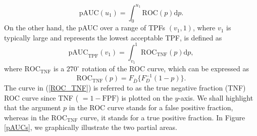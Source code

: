 \begin{equation}
\text{pAUC}\left(u_1\right) = \int_{0}^{u_1}\text{ROC}\left(p\right)\text{d}p.
\label{pAUC}
\end{equation}
On the other hand, the pAUC over a range of TPFs $(v_1,1)$, where $v_1$ is typically large and represents the lowest acceptable TPF, is defined as
\begin{equation}
\text{pAUC}_{\text{TPF}}\left(v_1\right) = \int_{v_1}^{1}\text{ROC}_{\text{TNF}}\left(p\right)\text{d}p,
\label{pAUC_TPF}
\end{equation}
where $\text{ROC}_{\text{TNF}}$ is a $270^\circ$ rotation of the ROC curve, which can be expressed as 
\begin{equation}
\text{ROC}_{\text{TNF}}(p) = F_{\bar{D}}\{F_{D}^{-1}(1-p)\}.
\label{ROC_TNF}
\end{equation}
The curve in (\ref{ROC_TNF}) is referred to as the true negative fraction (TNF) ROC curve since TNF ( $= 1 - \text{FPF}$) is plotted on the $y$-axis. We shall highlight that the argument $p$ in the ROC curve stands for a false positive fraction, whereas in the $\text{ROC}_{\text{TNF}}$ curve, it stands for a true positive fraction. In Figure \ref{pAUCs}, we graphically illustrate the two partial areas.

